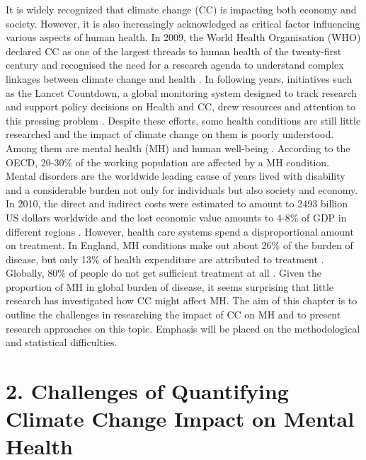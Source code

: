 \documentclass[
]{krantz}
\begin{document}
It is widely recognized that climate change (CC) is impacting both economy and society. However, it is also increasingly acknowledged as critical factor influencing various aspects of human health. In 2009, the World Health Organisation (WHO) declared CC as one of the largest threads to human health of the twenty-first century and recognised the need for a research agenda to understand complex linkages between climate change and health \citep{worldhealthorganizationProtectingHealthClimate2009}. In following years, initiatives such as the Lancet Countdown, a global monitoring system designed to track research and support policy decisions on Health and CC, drew resources and attention to this pressing problem \citep{wattsLancetCountdownHealth2018}. Despite these efforts, some health conditions are still little researched and the impact of climate change on them is poorly understood. Among them are mental health (MH) and human well-being \citep{romanello2023ReportLancet2023a}.
According to the OECD, 20-30\% of the working population are affected by a MH condition. Mental disorders are the worldwide leading cause of years lived with disability \citep[\citet{hewlette.MakingMentalHealth2014}]{whitefordGlobalBurdenDisease2013} and a considerable burden not only for individuals but also society and economy. In 2010, the direct and indirect costs were estimated to amount to 2493 billion US dollars worldwide \citep{hewlette.MakingMentalHealth2014} and the lost economic value amounts to 4-8\% of GDP in different regions \citep{ariasQuantifyingGlobalBurden2022}. However, health care systems spend a disproportional amount on treatment. In England, MH conditions make out about 26\% of the burden of disease, but only 13\% of health expenditure are attributed to treatment \citep{hewlette.MakingMentalHealth2014}. Globally, 80\% of people do not get sufficient treatment at all \citep{worldhealthorganizationComprehensiveMentalHealth2021}.
Given the proportion of MH in global burden of disease, it seems surprising that little research has investigated how CC might affect MH. The aim of this chapter is to outline the challenges in researching the impact of CC on MH and to present research approaches on this topic. Emphasis will be placed on the methodological and statistical difficulties.

\section{2. Challenges of Quantifying Climate Change Impact on Mental Health}\label{challenges-of-quantifying-climate-change-impact-on-mental-health}
\end{document}
